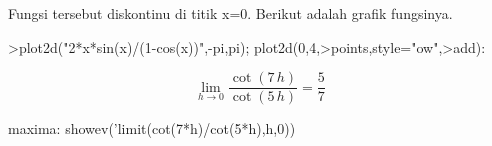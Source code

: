 \documentclass[a4paper,10pt]{article}
\begin{document}
\begin{eulernotebook}
\begin{eulercomment}
\begin{eulercomment}
\begin{eulercomment}
Fungsi tersebut diskontinu di titik x=0. Berikut adalah grafik fungsinya.
\end{eulercomment}
\begin{eulerprompt}
>plot2d("2*x*sin(x)/(1-cos(x))",-pi,pi); plot2d(0,4,>points,style="ow",>add):
\end{eulerprompt}
\begin{eulerformula}
\[
\lim_{h\rightarrow 0}{\frac{\cot \left(7\,h\right)}{\cot \left(5\,h  \right)}}=\frac{5}{7}
\]
\end{eulerformula}
\begin{eulercomment}
maxima: showev('limit(cot(7*h)/cot(5*h),h,0))


\end{eulercomment}
\end{eulercomment}
\end{eulercomment}
\end{eulernotebook}
\end{document}
